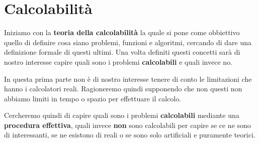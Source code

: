 \chapter{Calcolabilità}
Iniziamo con la \textbf{teoria della calcolabilità} la quale 
si pone come obbiettivo quello di definire cosa siano problemi, 
funzioni e algoritmi, cercando di dare una definizione formale 
di questi ultimi. Una volta definiti questi concetti sarà di 
nostro interesse capire quali sono i problemi 
\textbf{calcolabili} e quali invece no. 

In questa prima parte non è di nostro interesse tenere di conto 
le limitazioni che hanno i calcolatori reali. Ragioneremo quindi 
supponendo che non questi non abbiamo limiti in tempo o spazio 
per effettuare il calcolo.

Cercheremo quindi di capire quali sono i problemi 
\textbf{calcolabili} mediante una \textbf{procedura effettiva}, 
quali invece \textbf{non} sono calcolabili per capire se ce ne 
sono di interessanti, se ne esistono di reali o se sono solo 
artificiali e puramente teorici.
